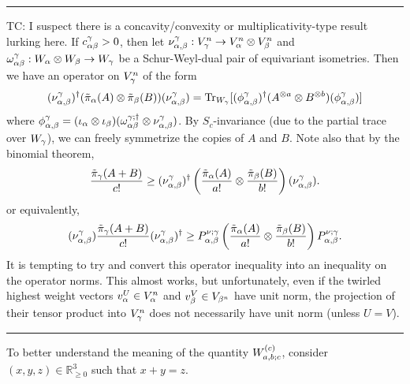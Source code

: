 \documentclass[notitlepage, 10pt]{article}
\begin{document}
\hrule
    TC: I suspect there is a concavity/convexity or multiplicativity-type result lurking here.
    If $c^{\gamma}_{\alpha\beta} > 0$, then let $\nu^{\gamma}_{\alpha,\beta} : V_{\gamma}^{n} \to V_{\alpha}^{n} \otimes V_{\beta}^{n}$ and $\omega^{\gamma}_{\alpha\beta} : W_{\alpha} \otimes W_{\beta} \to W_{\gamma}$ be a Schur-Weyl-dual pair of equivariant isometries.
    Then we have an operator on $V_{\gamma}^{n}$ of the form
    \begin{equation}
        (\nu^{\gamma}_{\alpha,\beta})^{\dagger}(\tilde \pi_{\alpha}(A) \otimes \tilde \pi_{\beta}(B))(\nu^{\gamma}_{\alpha,\beta}) = \operatorname{Tr}_{W_{\gamma}}[(\phi^{\gamma}_{\alpha,\beta})^{\dagger} (A^{\otimes a} \otimes B^{\otimes b}) (\phi^{\gamma}_{\alpha,\beta})]
    \end{equation}
    where $\phi^{\gamma}_{\alpha,\beta} = (\iota_{\alpha} \otimes \iota_{\beta})(\omega^{\gamma;\dagger}_{\alpha\beta} \otimes \nu^{\gamma}_{\alpha,\beta})$.
    By $S_{c}$-invariance (due to the partial trace over $W_{\gamma}$), we can freely symmetrize the copies of $A$ and $B$.
    Note also that by the binomial theorem,
    \begin{equation}
        \frac{\tilde \pi_{\gamma}(A+B)}{c!} \geq (\nu^{\gamma}_{\alpha,\beta})^{\dagger}\left(\frac{\tilde \pi_{\alpha}(A)}{a!} \otimes \frac{\tilde \pi_{\beta}(B)}{b!}\right)(\nu^{\gamma}_{\alpha,\beta}).
    \end{equation}
    or equivalently,
    \begin{equation}
        (\nu^{\gamma}_{\alpha,\beta}) \frac{\tilde \pi_{\gamma}(A+B)}{c!}(\nu^{\gamma}_{\alpha,\beta})^{\dagger} \geq P^{\nu;\gamma}_{\alpha,\beta}\left(\frac{\tilde \pi_{\alpha}(A)}{a!} \otimes \frac{\tilde \pi_{\beta}(B)}{b!}\right)P^{\nu;\gamma}_{\alpha,\beta}.
    \end{equation}
    It is tempting to try and convert this operator inequality into an inequality on the operator norms.
    This almost works, but unfortunately, even if the twirled highest weight vectors $v_{\alpha}^{U} \in V_{\alpha}^n$ and $v_{\beta}^{V} \in V_{\beta^n}$ have unit norm, the projection of their tensor product into $V_{\gamma}^n$ does not necessarily have unit norm (unless $U=V$).
\hrule
    To better understand the meaning of the quantity $W_{a,b;c}^{(c)}$, consider $(x,y,z) \in \mathbb R_{\geq 0}^{3}$ such that $x+y=z$.
\end{document}
